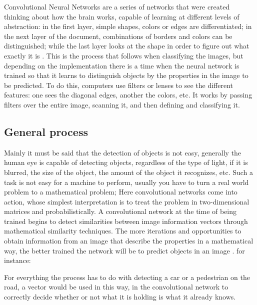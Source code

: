 Convolutional Neural Networks are a series of networks that were created
thinking about how the brain works, capable of learning at different levels of
abstraction: in the first layer, simple shapes, colors or edges are
differentiated; in the next layer of the document, combinations of borders and
colors can be distinguished; while the last layer looks at the shape in order to
figure out what exactly it is \cite{whatisacnn}. This is the process that follows when
classifying the images, but depending on the implementation there is a time
when the neural network is trained so that it learns to distinguish objects by
the properties in the image to be predicted. To do this, computers use filters
or lenses to see the different features: one sees the diagonal edges, another
the colors, etc. It works by passing filters over the entire image, scanning it,
and then defining and classifying it.

\subsection{General process}
Mainly it must be said that the detection of objects is not easy, generally the
human eye is capable of detecting objects, regardless of the type of light, if
it is blurred, the size of the object, the amount of the object it recognizes,
etc. Such a task is not easy for a machine to perform, usually you have to
turn a real world problem to a mathematical problem; Here convolutional networks
come into action, whose simplest interpretation is to treat the problem in
two-dimensional matrices and probabilistically. A convolutional network at the
time of being trained begins to detect similarities between image information
vectors through mathematical similarity techniques. The more iterations and
opportunities to obtain information from an image that describe the properties
in a mathematical way, the better trained the network will be to predict objects
in an image \cite{generalprocess}. for instance:

For everything the process has to do with detecting a car or a pedestrian on
the road, a vector would be used in this way, in the convolutional network to
correctly decide whether or not what it is holding is what it already knows.

